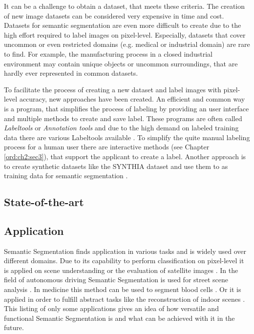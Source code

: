 It can be a challenge to obtain a dataset, that meets these criteria.
The creation of new image datasets can be considered very expensive in time and cost.
Datasets for semantic segmentation are even more difficult to create due to the high effort required to label images on pixel-level.
Especially, datasets that cover uncommon or even restricted domains (e.g. medical or industrial domain) are rare to find.
For example, the manufacturing process in a closed industrial environment may contain unique objects or uncommon surroundings, that are hardly ever represented in common datasets.

To facilitate the process of creating a new dataset and label images with pixel-level accuracy, new approaches have been created.
An efficient and common way is a program, that simplifies the process of labeling by providing an user interface and multiple methods to create and save label.
These programs are often called \textit{Labeltools} or \textit{Annotation tools} and due to the high demand on labeled training data there are various Labeltools available \cite{Cer20-AnnotationsTools}.
To simplify the quite manual labeling process for a human user there are interactive methods (see Chapter \ref{ord:ch2:sec3}), that support the applicant to create a label.
Another approach is to create synthetic datasets like the SYNTHIA dataset \cite{Bengar2019-Temporal} and use them to as training data for semantic segmentation \cite{Chen18-SyntheticData}.


\subsection{State-of-the-art}\label{ord:ch2:sec2:subsec5}
\subsection{Application}\label{ord:ch2:sec2:subsec6}
Semantic Segmentation finds application in various tasks and is widely used over different domains.
Due to its capability to perform classification on pixel-level it is applied on scene understanding \cite{LiJ09-SceneUnderstanding} or the evaluation of satellite images \cite{Li18-SateliteImagery}.
In the field of autonomous driving Semantic Segmentation is used for street scene analysis \cite{Cor16-Cityscapes} \cite{Men15-AutonVehicles} \cite{Neu17-MapillaryDataset}.
In medicine this method can be used to segment blood cells \cite{Tran19-BloodCell}.
Or it is applied in order to fulfill abstract tasks like the reconstruction of indoor scenes \cite{Dai17-ReconstructionIndoorScenes}.
This listing of only some applications gives an idea of how versatile and functional Semantic Segmentation is and what can be achieved with it in the future.